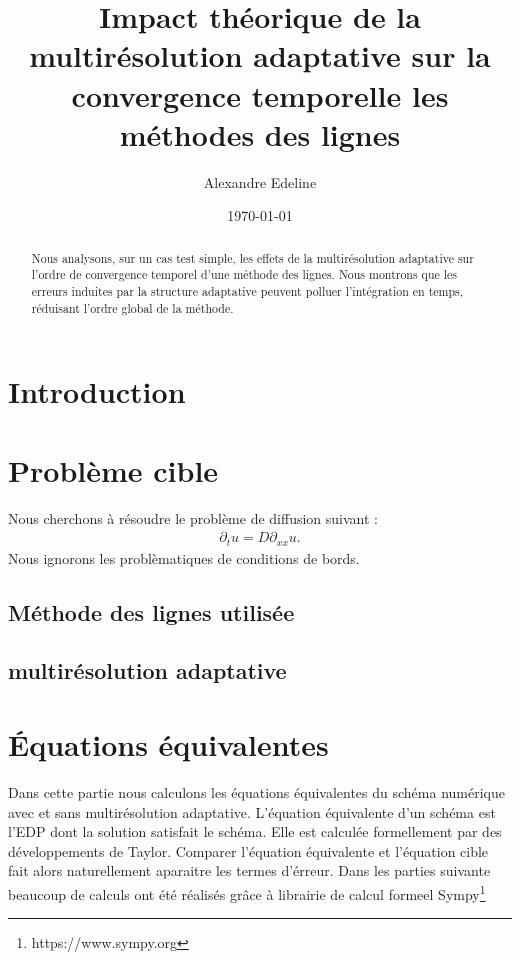 \documentclass[11pt]{article}
\title{Impact théorique de la multirésolution adaptative sur la convergence temporelle les méthodes des lignes}
\author{Alexandre Edeline}%
\date{\today}
\theoremstyle{definition}
\theoremstyle{remark}
\newcommand{\dt}[1]{\partial_t #1}
\newcommand{\dxx}[1]{\partial_{xx} #1}
\begin{document}
\maketitle

\begin{abstract}
Nous analysons, sur un cas test simple, les effets de la multirésolution adaptative sur l'ordre de convergence temporel d'une méthode des lignes. Nous montrons que les erreurs induites par la structure adaptative peuvent polluer l'intégration en temps, réduisant l'ordre global de la méthode.
\end{abstract}

\section{Introduction}
    
\newpage
\section{Problème cible}
    Nous cherchons à résoudre le problème de diffusion suivant :
    \begin{align}
        \dt{u} = D \dxx{u}.
    \end{align}
    Nous ignorons les problèmatiques de conditions de bords.
        \subsection{Méthode des lignes utilisée}
            
        \subsection{multirésolution adaptative}
            
\newpage
\section{Équations équivalentes}
    Dans cette partie nous calculons les équations équivalentes du schéma numérique avec et sans multirésolution adaptative.
    L'équation équivalente d'un schéma est l'EDP dont la solution satisfait le schéma. Elle est calculée formellement par des développements de Taylor.
    Comparer l'équation équivalente et l'équation cible fait alors naturellement aparaitre les termes d'érreur. 
    Dans les parties suivante beaucoup de calculs ont été réalisés grâce à librairie de calcul formeel Sympy\footnote{https://www.sympy.org}
    
\end{document}
